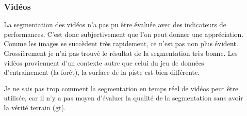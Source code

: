 \subsubsection{Vidéos}
La segmentation des vidéos n'a pas pu être évaluée avec des indicateurs de performances. C'est donc subjectivement que l'on peut donner une appréciation. Comme les images se succèdent très rapidement, ce n'est pas non plus évident. Grossièrement je n'ai pas trouvé le résultat de la segmentation très bonne. Les vidéos proviennent d'un contexte autre que celui du jeu de données d'entrainement (la forêt), la surface de la piste est bien différente. 
\par Je ne sais pas trop comment la segmentation en temps réel de vidéos peut être utilisée, car il n'y a pas moyen d'évaluer la qualité de la segmentation sans avoir la vérité terrain (\acrshort{gt}).